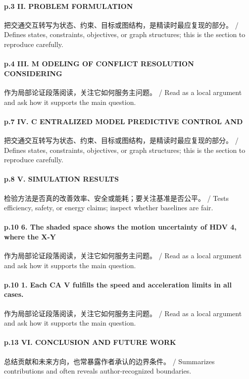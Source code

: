 \documentclass[UTF8,a4paper,11pt,fontset=fandol]{ctexart}
\begin{document}
\paragraph{p.3 II. PROBLEM FORMULATION}把交通交互转写为状态、约束、目标或图结构，是精读时最应复现的部分。 / Defines states, constraints, objectives, or graph structures; this is the section to reproduce carefully.

\paragraph{p.4 III. M ODELING OF CONFLICT RESOLUTION CONSIDERING}作为局部论证段落阅读，关注它如何服务主问题。 / Read as a local argument and ask how it supports the main question.

\paragraph{p.7 IV. C ENTRALIZED MODEL PREDICTIVE CONTROL AND}把交通交互转写为状态、约束、目标或图结构，是精读时最应复现的部分。 / Defines states, constraints, objectives, or graph structures; this is the section to reproduce carefully.

\paragraph{p.8 V. SIMULATION RESULTS}检验方法是否真的改善效率、安全或能耗；要关注基准是否公平。 / Tests efficiency, safety, or energy claims; inspect whether baselines are fair.

\paragraph{p.10 6. The shaded space shows the motion uncertainty of HDV 4, where the X-Y}作为局部论证段落阅读，关注它如何服务主问题。 / Read as a local argument and ask how it supports the main question.

\paragraph{p.10 1. Each CA V fulfills the speed and acceleration limits in all cases.}作为局部论证段落阅读，关注它如何服务主问题。 / Read as a local argument and ask how it supports the main question.

\paragraph{p.13 VI. CONCLUSION AND FUTURE WORK}总结贡献和未来方向，也常暴露作者承认的边界条件。 / Summarizes contributions and often reveals author-recognized boundaries.
\end{document}
